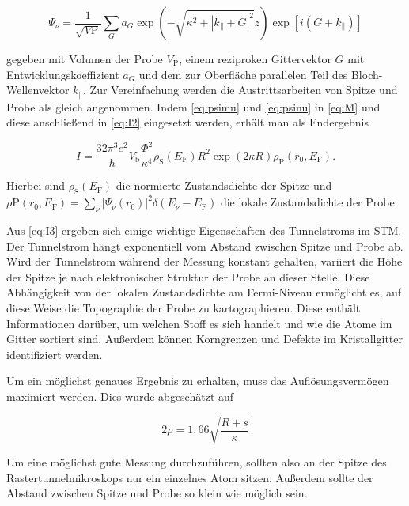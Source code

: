 \documentclass[
	a4paper,
	12pt,
	pagesize,
	ngerman
]{scrartcl}
\begin{document}
\begin{equation}
	\Psi_\nu = \frac{1}{\sqrt{V\text{P}}} \sum_{G} a_G \exp(-\sqrt{\kappa^2 + |k_\parallel + G|^2}z) \exp[i(G + k_\parallel)]
	\label{eq:psinu}
\end{equation}

gegeben mit Volumen der Probe $V_\text{P}$, einem reziproken Gittervektor $G$ mit Entwicklungskoeffizient $a_G$ und dem zur Oberfläche parallelen Teil des Bloch-Wellenvektor $k_\parallel$.
Zur Vereinfachung werden die Austrittsarbeiten von Spitze und Probe als gleich angenommen. Indem \cref{eq:psimu} und \cref{eq:psinu} in \cref{eq:M} und diese anschließend in \cref{eq:I2} eingesetzt werden, erhält man als Endergebnis

\begin{equation}
	I = \frac{32 \pi^3 e^2}{\hbar} V_{\text{b}} \frac{\Phi^2}{\kappa^4} \rho_\text{S}(E_\text{F}) R^2 \exp(2 \kappa R) \rho_\text{P}(r_0, E_\text{F}).
	\label{eq:I3}
\end{equation}

Hierbei sind $\rho_\text{S}(E_\text{F})$ die normierte Zustandsdichte der Spitze und $\rho\text{P}(r_0, E_\text{F}) = \sum_{\nu} |\Psi_\nu(r_0)|^2 \delta(E_\nu - E_\text{F})$ die lokale Zustandsdichte der Probe.

Aus \cref{eq:I3} ergeben sich einige wichtige Eigenschaften des Tunnelstroms im STM. Der Tunnelstrom hängt exponentiell vom Abstand zwischen Spitze und Probe ab.
Wird der Tunnelstrom während der Messung konstant gehalten, variiert die Höhe der Spitze je nach elektronischer Struktur der Probe an dieser Stelle. Diese Abhängigkeit von der lokalen Zustandsdichte am Fermi-Niveau ermöglicht es, auf diese Weise die Topographie der Probe zu kartographieren. Diese enthält Informationen darüber, um welchen Stoff es sich handelt und wie die Atome im Gitter sortiert sind. Außerdem können Korngrenzen und Defekte im Kristallgitter identifiziert werden.

Um ein möglichst genaues Ergebnis zu erhalten, muss das Auflösungsvermögen maximiert werden. Dies wurde abgeschätzt auf

\begin{equation}
	2\rho = 1,66 \sqrt{\frac{R + s}{\kappa}}
	\label{eq:sigma}
\end{equation}

Um eine möglichst gute Messung durchzuführen, sollten also an der Spitze des Rastertunnelmikroskops nur ein einzelnes Atom sitzen. Außerdem sollte der Abstand zwischen Spitze und Probe so klein wie möglich sein.
\end{document}
